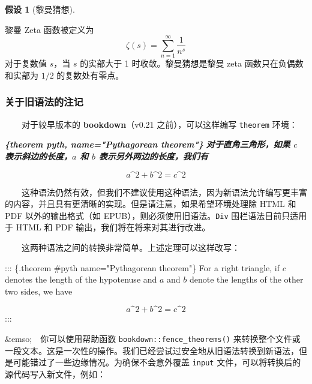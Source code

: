 \documentclass[
  12pt,
]{krantz}
\newenvironment{Shaded}{\begin{snugshade}}{\end{snugshade}}
\newcommand{\InformationTok}[1]{\textcolor[rgb]{0.56,0.35,0.01}{\textbf{\textit{#1}}}}
\newcommand{\NormalTok}[1]{#1}
\theoremstyle{definition}
\theoremstyle{definition}
\theoremstyle{definition}
\theoremstyle{definition}
\newtheorem{hypothesis}{假设}[chapter]
\theoremstyle{remark}
\begin{document}
\begin{hypothesis}[黎曼猜想]
\protect\hypertarget{hyp:unlabeled-div-9}{}\label{hyp:unlabeled-div-9}

黎曼 Zeta 函数被定义为
\[\zeta(s) = \sum_{n=1}^{\infty} \frac{1}{n^s}\]
对于复数值 \(s\)，当 \(s\) 的实部大于 1 时收敛。黎曼猜想是黎曼 zeta 函数只在负偶数和实部为 \(1/2\) 的复数处有零点。

\end{hypothesis}

\hypertarget{theorem-engine}{%
\subsubsection{关于旧语法的注记}\label{theorem-engine}}

  对于较早版本的 \textbf{bookdown}（v0.21 之前），可以这样编写 \texttt{theorem} 环境：

\begin{Shaded}
\begin{Highlighting}[]
\InformationTok{\textasciigrave{}\textasciigrave{}\textasciigrave{}\{theorem pyth, name="Pythagorean theorem"\}}
\InformationTok{对于直角三角形，如果 $c$ 表示斜边的长度，$a$ 和 $b$ 表示另外两边的长度，我们有}

\InformationTok{$$a\^{}2 + b\^{}2 = c\^{}2$$}
\InformationTok{\textasciigrave{}\textasciigrave{}\textasciigrave{}}
\end{Highlighting}
\end{Shaded}

  这种语法仍然有效，但我们不建议使用这种语法，因为新语法允许编写更丰富的内容，并且具有更清晰的实现。但是请注意，如果希望环境处理除 HTML 和 PDF 以外的输出格式（如 EPUB），则必须使用旧语法。\texttt{Div} 围栏语法目前只适用于 HTML 和 PDF 输出，我们将在将来对其进行改进。

  这两种语法之间的转换非常简单。上述定理可以这样改写：

\begin{Shaded}
\begin{Highlighting}[]
\NormalTok{::: \{.theorem \#pyth name="Pythagorean theorem"\}}
\NormalTok{For a right triangle, if $c$ denotes the length of the hypotenuse}
\NormalTok{and $a$ and $b$ denote the lengths of the other two sides, we have}

\NormalTok{$$a\^{}2 + b\^{}2 = c\^{}2$$}
\NormalTok{:::}
\end{Highlighting}
\end{Shaded}

\&emso; 你可以使用帮助函数 \texttt{bookdown::fence\_theorems()} 来转换整个文件或一段文本。这是一次性的操作。我们已经尝试过安全地从旧语法转换到新语法，但是可能错过了一些边缘情况。为确保不会意外覆盖 \texttt{input} 文件，可以将转换后的源代码写入新文件，例如：
\end{document}
